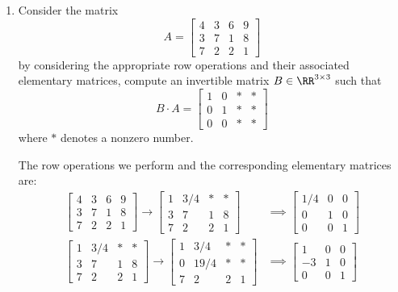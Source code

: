 \documentclass{article}
\begin{document}
\begin{enumerate}
		\newpage
	\item Consider the matrix \[A=\begin{bmatrix}
				4 & 3 & 6 & 9 \\
				3 & 7 & 1 & 8 \\
				7 & 2 & 2 & 1
		\end{bmatrix}\] by considering the appropriate row operations and their associated elementary matrices, compute an invertible matrix $B\in\RR^{3\times 3}$ such that \[B\cdot A = \begin{bmatrix}
				1 & 0 & * & * \\
				0 & 1 & * & * \\
				0 & 0 & * & *
		\end{bmatrix} \] where $*$ denotes a nonzero number.
		\begin{soln}
			The row operations we perform and the corresponding elementary matrices are:
			\begin{align*}
				\begin{bmatrix}
					4 & 3 & 6 & 9 \\
					3 & 7 & 1 & 8 \\
					7 & 2 & 2 & 1
				\end{bmatrix} \to \begin{bmatrix}
					1 & 3/4 & * & * \\
					3 & 7 & 1 & 8 \\
					7 & 2 & 2 & 1
				\end{bmatrix} &\implies \begin{bmatrix}
					1/4 & 0 & 0 \\
					0 & 1 & 0 \\
					0 & 0 & 1
				\end{bmatrix} \\
				\begin{bmatrix}
					1 & 3/4 & * & * \\
					3 & 7 & 1 & 8 \\
					7 & 2 & 2 & 1
				\end{bmatrix} \to \begin{bmatrix}
					1 & 3/4 & * & * \\
					0 & 19/4 & * & * \\
					7 & 2 & 2 & 1
				\end{bmatrix} &\implies \begin{bmatrix}
					1 & 0 & 0 \\
					-3 & 1 & 0 \\
					0 & 0 & 1
				\end{bmatrix} \\

\end{align*}
\end{soln}
\end{enumerate}
\end{document}
